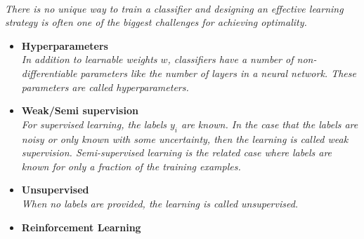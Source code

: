 \documentclass[12pt,letterpaper]{article}
\begin{document}
\begin{itemize}
\begin{itemize}
		\\\textit{There is no unique way to train a classifier and designing an effective learning strategy is often one of the biggest challenges for achieving optimality.}
			\begin{itemize}
				\item \textbf{Hyperparameters}~\cite{Glowacki:2026snv,Bardhan:2024ibw,Allaire:2023dfg,Schroff:2023see,DeZoort:2023dvb,Bevan:2017stx,Dudko:2021cie,Tani:2020dyi}
				\\\textit{In addition to learnable weights $w$, classifiers have a number of non-differentiable parameters like the number of layers in a neural network.  These parameters are called hyperparameters.}
				\item \textbf{Weak/Semi supervision}~\cite{Amaro:2026vga,Bhargava:2025xig,Chen:2025vpa,Rieck:2025xnh,Chen:2024nvc,Lieberman:2024hga,Beauchesne:2023vie,Witkowski:2023htt,Bardhan:2023mia,Dolan:2022ikg,LeBlanc:2022bwd,Finke:2022lsu,Li:2022omf,Komiske:2022vxg,Lieberman:2021krq,Lee:2019ssx,Dahbi:2020zjw,Brewer:2020och,Amram:2020ykb,collaboration2020dijet,Metodiev:2018ftz,Komiske:2018vkc,Cohen:2017exh,Borisyak:2019vbz,Collins:2019jip,Collins:2018epr,Komiske:2018oaa,Metodiev:2017vrx,Dery:2017fap}
				\\\textit{For supervised learning, the labels $y_i$ are known.  In the case that the labels are noisy or only known with some uncertainty, then the learning is called weak supervision.  Semi-supervised learning is the related case where labels are known for only a fraction of the training examples.}
				\item \textbf{Unsupervised}~\cite{Parker:2026ywx,Marriott-Clarke:2026zyc,Amaro:2026vga,Tsoi:2026rnt,DeGraw:2025elg,Lv:2025nvq,Abdelhaq:2025nch,Chowdhury:2025mul,Coradin:2025ees,Katel:2024ygn,Sheldon:2024sbe,Cai:2024xnt,Lu:2024ict,Kishimoto:2023cys,Badea:2023jdb,Kitouni:2023rct,Huang:2023kgs,Dillon:2021gag,Howard:2021pos,Cai:2020vzx,Dillon:2019cqt,1797846,Komiske:2019fks,Mackey:2015hwa}
                                  \\\textit{When no labels are provided, the learning is called unsupervised.}
				\item \textbf{Reinforcement Learning}~\cite{Ibrahim:2026imt,Adriamirado:2026rvn,Alexander:2026lpw,deSouza:2026sta,Zoccheddu:2026cjr,Giarnetti:2025mit,Mendizabal:2025sbf,Dillon:2025dxr,Baretz:2025zsv,Zeng:2025xbh,Nishimura:2024apb,Angloher:2023oya,Alvestad:2023jgl,Nishimura:2023wdu,Dersy:2022bym,Windisch:2021mem,Cranmer:2021gdt,Harvey:2021oue,John:2020sak,Brehmer:2020brs,Carrazza:2019efs}

\end{itemize}
\end{itemize}
\end{itemize}
\end{document}
